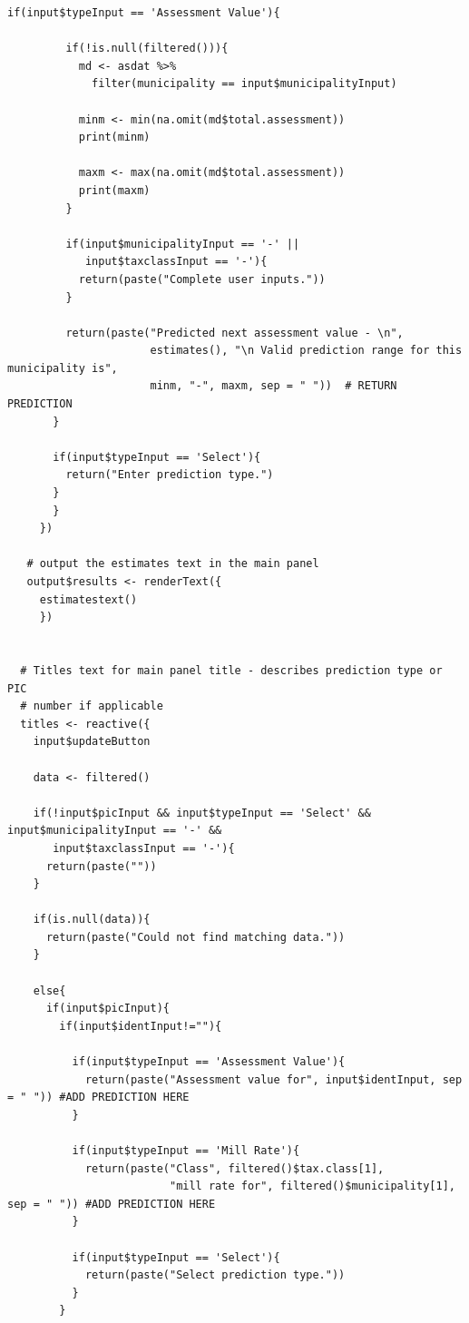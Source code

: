 \documentclass{article}
\begin{document}
\begin{lstlisting}[style=R, caption={Code used for the Shiny app.}, captionpos=b]
       if(input$typeInput == 'Assessment Value'){
         
         if(!is.null(filtered())){
           md <- asdat %>%
             filter(municipality == input$municipalityInput)

           minm <- min(na.omit(md$total.assessment))
           print(minm)

           maxm <- max(na.omit(md$total.assessment))
           print(maxm)
         }
         
         if(input$municipalityInput == '-' || 
            input$taxclassInput == '-'){
           return(paste("Complete user inputs."))
         }

         return(paste("Predicted next assessment value - \n",
                      estimates(), "\n Valid prediction range for this municipality is",
                      minm, "-", maxm, sep = " "))  # RETURN PREDICTION
       }
        
       if(input$typeInput == 'Select'){
         return("Enter prediction type.")
       }
       }
     })
  
   # output the estimates text in the main panel
   output$results <- renderText({
     estimatestext()
     })
  
  
  # Titles text for main panel title - describes prediction type or PIC 
  # number if applicable
  titles <- reactive({
    input$updateButton
    
    data <- filtered()
    
    if(!input$picInput && input$typeInput == 'Select' && input$municipalityInput == '-' &&
       input$taxclassInput == '-'){
      return(paste(""))
    }
    
    if(is.null(data)){
      return(paste("Could not find matching data."))
    }
    
    else{
      if(input$picInput){
        if(input$identInput!=""){
          
          if(input$typeInput == 'Assessment Value'){
            return(paste("Assessment value for", input$identInput, sep = " ")) #ADD PREDICTION HERE
          }
          
          if(input$typeInput == 'Mill Rate'){
            return(paste("Class", filtered()$tax.class[1], 
                         "mill rate for", filtered()$municipality[1], sep = " ")) #ADD PREDICTION HERE
          }
          
          if(input$typeInput == 'Select'){
            return(paste("Select prediction type."))
          }
        }
        

\end{lstlisting}
\end{document}
